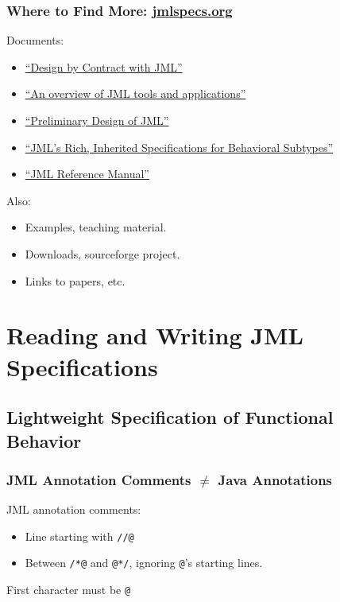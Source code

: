 \begin{frame}
\frametitle{Where to Find More: \href{http://www.jmlspecs.org}{jmlspecs.org}}

Documents:
\begin{itemize}
\item
\href{ftp://ftp.cs.iastate.edu/pub/leavens/JML/jmldbc.pdf}{``Design by Contract with JML''}

\item
\href{http://dx.doi.org/10.1007/s10009-004-0167-4}{``An overview of JML tools and applications''}

\item
\href{http://doi.acm.org/10.1145/1127878.1127884}{``Preliminary Design of JML''}

\item
\href{http://dx.doi.org/10.1007/11901433}{``JML's Rich, Inherited Specifications for Behavioral Subtypes''}

\item
\href{http://www.jmlspecs.org/jmlrefman/jmlrefman_toc.html}{``JML Reference Manual''}
\end{itemize}

Also:
\begin{itemize}
\item
Examples, teaching material.

\item
Downloads, sourceforge project.

\item
Links to papers, etc.
\end{itemize}

\end{frame}

\section[R/W]{Reading and Writing JML Specifications}

\subsection[Lightweight]{Lightweight Specification of Functional Behavior}

\begin{frame}[fragile]
\frametitle{JML Annotation Comments $\neq$ Java Annotations}

JML annotation comments:
\begin{itemize}
\item
Line starting with \lstinline!//@!

\item
Between \lstinline!/*@! and \lstinline!@*/!,
ignoring \lstinline!@!'s starting lines.
\end{itemize}

First character must be \lstinline!@!

\end{frame}


